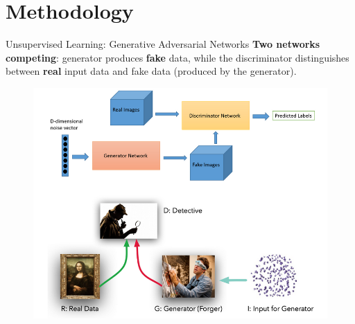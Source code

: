 \documentclass[11pt,aspectratio=169]{beamer}
\begin{document}
\section{Methodology}

\begin{frame}{Unsupervised Learning: Generative Adversarial Networks}
    \textbf{Two networks competing}: generator produces \textbf{fake} data, while the discriminator
distinguishes between \textbf{real} input data and fake data (produced by the generator).
\begin{figure}
    \includegraphics[width=0.8 \textwidth]{figures/gan_image.jpg}
\end{figure}
    
\end{frame}

\end{document}
